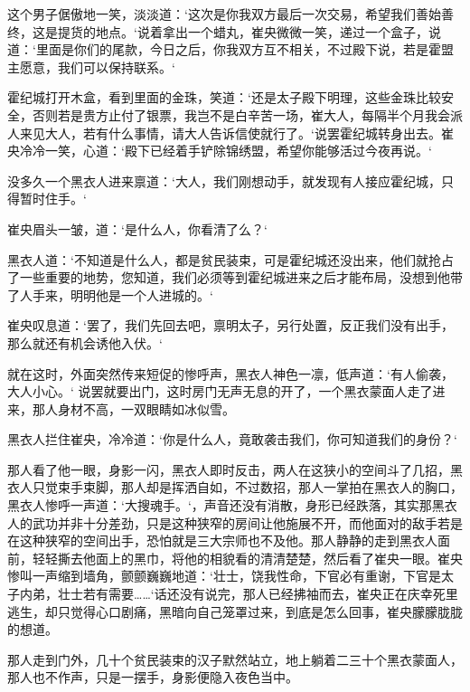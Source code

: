 这个男子倨傲地一笑，淡淡道：‘这次是你我双方最后一次交易，希望我们善始善终，这是提货的地点。‘说着拿出一个蜡丸，崔央微微一笑，递过一个盒子，说道：‘里面是你们的尾款，今日之后，你我双方互不相关，不过殿下说，若是霍盟主愿意，我们可以保持联系。‘

霍纪城打开木盒，看到里面的金珠，笑道：‘还是太子殿下明理，这些金珠比较安全，否则若是贵方止付了银票，我岂不是白辛苦一场，崔大人，每隔半个月我会派人来见大人，若有什么事情，请大人告诉信使就行了。‘说罢霍纪城转身出去。崔央冷冷一笑，心道：‘殿下已经着手铲除锦绣盟，希望你能够活过今夜再说。‘

没多久一个黑衣人进来禀道：‘大人，我们刚想动手，就发现有人接应霍纪城，只得暂时住手。‘

崔央眉头一皱，道：‘是什么人，你看清了么？‘

黑衣人道：‘不知道是什么人，都是贫民装束，可是霍纪城还没出来，他们就抢占了一些重要的地势，您知道，我们必须等到霍纪城进来之后才能布局，没想到他带了人手来，明明他是一个人进城的。‘

崔央叹息道：‘罢了，我们先回去吧，禀明太子，另行处置，反正我们没有出手，那么就还有机会诱他入伏。‘

就在这时，外面突然传来短促的惨呼声，黑衣人神色一凛，低声道：‘有人偷袭，大人小心。‘ 说罢就要出门，这时房门无声无息的开了，一个黑衣蒙面人走了进来，那人身材不高，一双眼睛如冰似雪。

黑衣人拦住崔央，冷冷道：‘你是什么人，竟敢袭击我们，你可知道我们的身份？‘

那人看了他一眼，身影一闪，黑衣人即时反击，两人在这狭小的空间斗了几招，黑衣人只觉束手束脚，那人却是挥洒自如，不过数招，那人一掌拍在黑衣人的胸口，黑衣人惨呼一声道：‘大搜魂手。‘，声音还没有消散，身形已经跌落，其实那黑衣人的武功并非十分差劲，只是这种狭窄的房间让他施展不开，而他面对的敌手若是在这种狭窄的空间出手，恐怕就是三大宗师也不及他。那人静静的走到黑衣人面前，轻轻撕去他面上的黑巾，将他的相貌看的清清楚楚，然后看了崔央一眼。崔央惨叫一声缩到墙角，颤颤巍巍地道：‘壮士，饶我性命，下官必有重谢，下官是太子内弟，壮士若有需要……‘话还没有说完，那人已经拂袖而去，崔央正在庆幸死里逃生，却只觉得心口剧痛，黑暗向自己笼罩过来，到底是怎么回事，崔央朦朦胧胧的想道。

那人走到门外，几十个贫民装束的汉子默然站立，地上躺着二三十个黑衣蒙面人，那人也不作声，只是一摆手，身影便隐入夜色当中。

